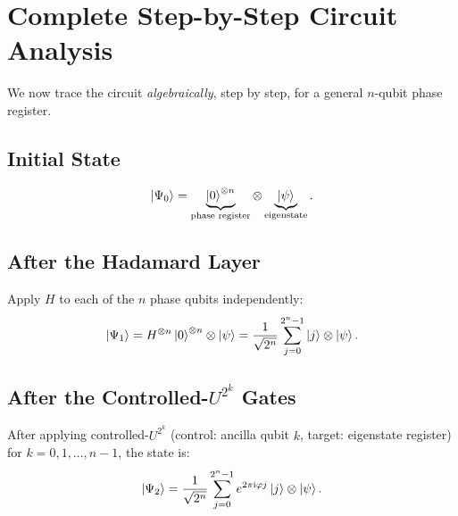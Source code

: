 \documentclass[12pt,a4paper]{article}
\newcommand{\ii}{\mathrm{i}}
\begin{document}
\section{Complete Step-by-Step Circuit Analysis}
\label{sec:derivation}

We now trace the circuit \emph{algebraically}, step by step, for a general
$n$-qubit phase register.

\subsection{Initial State}

\[
  \Ket{\Psi_0} = \underbrace{\Ket{0}^{\otimes n}}_{\text{phase register}} \otimes
  \underbrace{\Ket{\psi}}_{\text{eigenstate}}.
\]

\subsection{After the Hadamard Layer}

Apply $H$ to each of the $n$ phase qubits independently:
\[
  \Ket{\Psi_1}
  = H^{\otimes n}\Ket{0}^{\otimes n}\otimes\Ket{\psi}
  = \frac{1}{\sqrt{2^n}}\sum_{j=0}^{2^n-1}\Ket{j}\otimes\Ket{\psi}.
\]

\subsection{After the Controlled-\texorpdfstring{$U^{2^k}$}{U^{}2^{}k} Gates}

\begin{proposition}{}{}
  After applying controlled-$U^{2^k}$ (control: ancilla qubit $k$, target:
  eigenstate register) for $k = 0, 1, \ldots, n-1$, the state is:
  \[
    \Ket{\Psi_2}
    = \frac{1}{\sqrt{2^n}}\sum_{j=0}^{2^n-1} e^{2\pi \ii \varphi j}\Ket{j}\otimes\Ket{\psi}.
  \]
\end{proposition}
\end{document}
